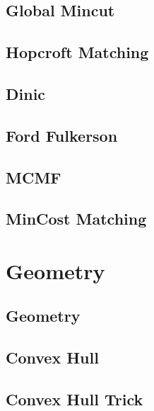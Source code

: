 \subsection{Global Mincut}
\raggedbottom
\subsection{Hopcroft Matching}
\raggedbottom
\subsection{Dinic}
\raggedbottom
\subsection{Ford Fulkerson}
\raggedbottom
\subsection{MCMF}
\raggedbottom
\subsection{MinCost Matching}
\raggedbottom

\section{Geometry}
\subsection{Geometry}
\raggedbottom
\subsection{Convex Hull}
\raggedbottom
\subsection{Convex Hull Trick}
\raggedbottom

